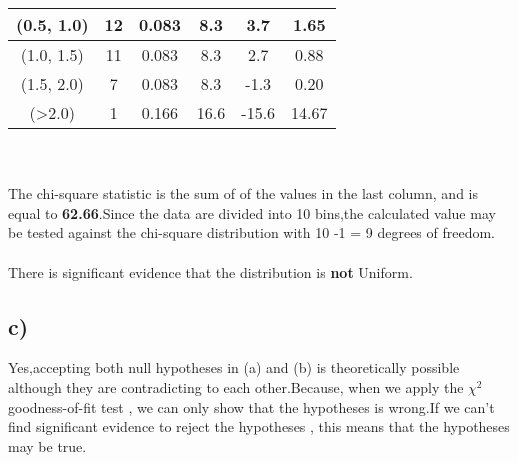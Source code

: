 \documentclass[12pt]{article}
\begin{document}
\begin{tabular}{|c|c|c|c|c|c|}
(0.5, 1.0)         & 12                                                                  & 0.083                                                                   & 8.3                                                                 & 3.7                          & 1.65                      \\ \hline
(1.0, 1.5)         & 11                                                                  & 0.083                                                                   & 8.3                                                                 & 2.7                          & 0.88                      \\ \hline
(1.5, 2.0)         & 7                                                                   & 0.083                                                                   & 8.3                                                                 & -1.3                         & 0.20                      \\ \hline
(\textgreater 2.0) & 1                                                                   & 0.166                                                                   & 16.6                                                                & -15.6                        & 14.67                     \\ \hline
\end{tabular}\\\\

The chi-square statistic is the sum of of the values in the last column, and is equal to \textbf{62.66}.Since the data are divided into 10 bins,the calculated value may be tested against the chi-square distribution with 10 -1 = 9 degrees of freedom.\\\\
{\large There is significant evidence that the distribution is \textbf{not} Uniform.}

\subsection*{c)}
Yes,accepting both null hypotheses in (a) and (b) is theoretically possible although they are contradicting to each other.Because, when we apply the $\chi^2$ goodness-of-fit test , we can only show that the hypotheses is wrong.If we can't find significant evidence to reject the hypotheses , this means that the hypotheses may be true.
\end{document}
